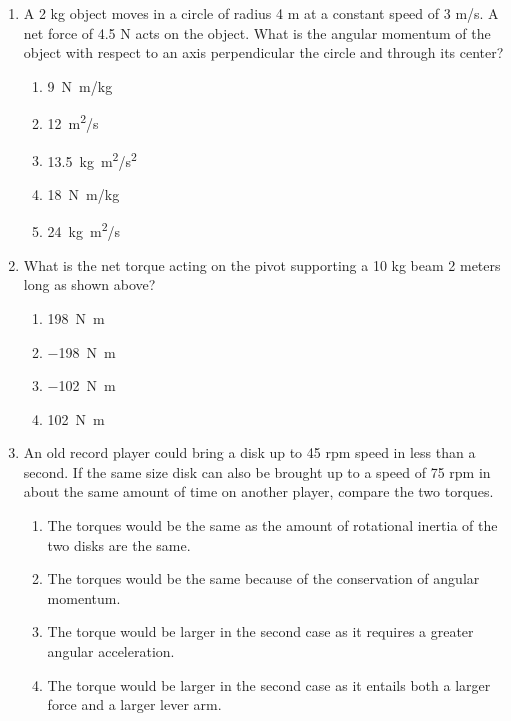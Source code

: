 \documentclass[11pt]{article}
\begin{document}
\begin{multicols}{2}
\begin{enumerate}[leftmargin=18pt,resume]
  \item A 2 kg object moves in a circle of radius 4 m at a constant speed of
    3 m/s. A net force of 4.5 N acts on the object. What is the angular
    momentum of the object with respect to an axis perpendicular the circle
    and through its center?
    \begin{enumerate}[noitemsep,topsep=0pt,leftmargin=18pt,label=(\Alph*)]
    \item\SI{9}{N.m/kg}
    \item\SI{12}{m^2/s}
    \item\SI{13.5}{kg.m^2/s^2}
    \item\SI{18}{N.m/kg}
    \item\SI{24}{kg.m^2/s}
    \end{enumerate}
    \columnbreak
    
    \begin{center}
    \end{center}
  \item What is the net torque acting on the pivot supporting a 10 kg beam 2
    meters long as shown above?
    \begin{enumerate}[noitemsep,topsep=0pt,leftmargin=18pt,label=(\Alph*)]
    \item\SI{198}{\newton.\metre}
    \item\SI{-198}{\newton.\metre}
    \item\SI{-102}{\newton.\metre}
    \item\SI{102}{\newton.\metre}
    \end{enumerate}

  \item An old record player could bring a disk up to 45 rpm speed in less than
    a second. If the same size disk can also be brought up to a speed of 75 rpm
    in about the same amount of time on another player, compare the two torques.
    \begin{enumerate}[noitemsep,topsep=0pt,leftmargin=18pt,label=(\Alph*)]
    \item The torques would be the same as the amount of rotational inertia of
      the two disks are the same.
    \item The torques would be the same because of the conservation of angular
      momentum.
    \item The torque would be larger in the second case as it requires a
      greater angular acceleration.
    \item The torque would be larger in the second case as it entails both a
      larger force and a larger lever arm.
    \end{enumerate}
  \end{enumerate}
  \columnbreak
  

\end{multicols}
\end{document}
